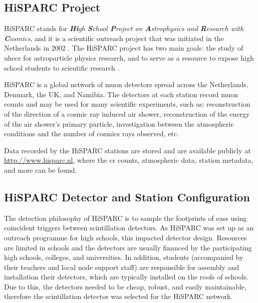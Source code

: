 \subsection{HiSPARC Project}

HiSPARC stands for \textit{\textbf{Hi}gh \textbf{S}chool \textbf{P}roject on \textbf{A}strophysics and \textbf{R}esearch with \textbf{C}osmics}, and it is a scientific outreach project that was initiated in the Netherlands in 2002 \citep{bartels_hisparc_2012}. The HiSPARC project has two main goals: the study of \gls{uhecr} for astroparticle physics research, and to serve as a resource to expose high school students to scientific research \citep{bartels_hisparc_2012}.

HiSPARC is a global network of muon detectors spread across the Netherlands, Denmark, the UK, and Namibia. The detectors at each station record muon counts and may be used for many scientific experiments, such as: reconstruction of the direction of a cosmic ray induced air shower, reconstruction of the energy of the air shower's primary particle, investigation between the atmospheric conditions and the number of cosmics rays observed, etc.

Data recorded by the HiSPARC stations are stored and are available publicly at \url{http://www.hisparc.nl}, where the \gls{cr} counts, atmospheric data, station metadata, and more can be found.

\subsection{HiSPARC Detector and Station Configuration}

The detection philosophy of HiSPARC is to sample the footprints of \glspl{eas} using coincident triggers between scintillation detectors. As HiSPARC was set up as an outreach programme for high schools, this impacted detector design. Resources are limited in schools and the detectors are usually financed by the participating high schools, colleges, and universities. In addition, students (accompanied by their teachers and local node support staff) are responsible for assembly and installation their detectors, which are typically installed on the roofs of schools. Due to this, the detectors needed to be cheap, robust, and easily maintainable, therefore the scintillation detector was selected for the HiSPARC network.

